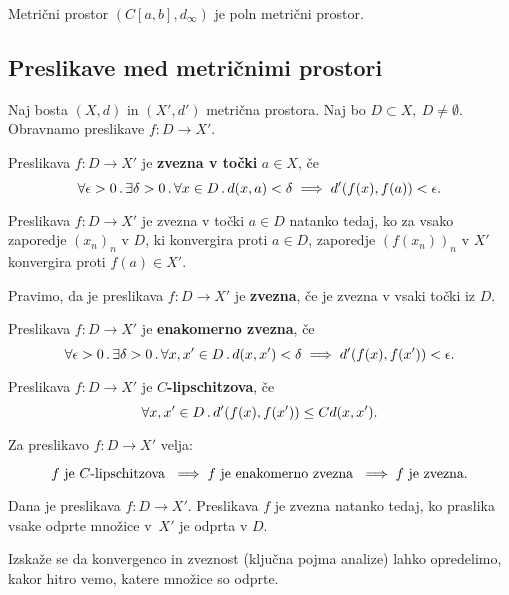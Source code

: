 \begin{izrek}
    Metrični prostor $(C[a,b], d_\infty)$ je poln metrični prostor.
\end{izrek}

\subsection*{Preslikave med metričnimi prostori}
Naj bosta $(X, d)$ in $(X', d')$ metrična prostora. Naj bo $D \subset X, \ D \neq \emptyset$. Obravnamo preslikave $f: D \to X'$.

\begin{definicija}
    Preslikava $f: D \to X'$ je \textbf{zvezna v točki} $a \in X$, če
    $$\forall \epsilon > 0 \,.\, \exists \delta > 0 \,.\, \forall x \in D \,.\, d(x, a) < \delta \implies d'(f(x), f(a)) < \epsilon.$$
\end{definicija}

\begin{izrek}
    Preslikava $f: D \to X'$ je zvezna v točki $a \in D$ natanko tedaj, ko za vsako zaporedje $(x_n)_n$ v $D$, ki konvergira proti $a \in D$, zaporedje $(f(x_n))_n$ v $X'$ konvergira proti $f(a) \in X'$. 
\end{izrek}

\begin{definicija}
    Pravimo, da je preslikava $f: D \to X'$ je \textbf{zvezna}, če je zvezna v vsaki točki iz $D$.
\end{definicija}

\begin{definicija}
    Preslikava $f: D \to X'$ je \textbf{enakomerno zvezna}, če
    $$\forall \epsilon > 0 \,.\, \exists \delta > 0 \,.\, \forall x, x' \in D \,.\, d(x, x') < \delta \implies d'(f(x), f(x')) < \epsilon.$$
\end{definicija}

\begin{definicija}
    Preslikava $f: D \to X'$ je \textbf{$C$-lipschitzova}, če
    $$\forall x, x' \in D \,.\, d'(f(x), f(x')) \leq Cd(x, x').$$
\end{definicija}

\begin{trditev}
    Za preslikavo $f: D \to X'$ velja:

    $$f \text{ je $C$-lipschitzova } \implies f \text{ je enakomerno zvezna } \implies f \text{ je zvezna}.$$
\end{trditev}

\begin{izrek}
    Dana je preslikava $f: D \to X'$. Preslikava $f$ je zvezna natanko tedaj, ko praslika vsake odprte množice v~$X'$ je odprta v $D$.
\end{izrek}

Izskaže se da konvergenco in zveznost (ključna pojma analize) lahko opredelimo, kakor hitro vemo, katere množice so odprte.